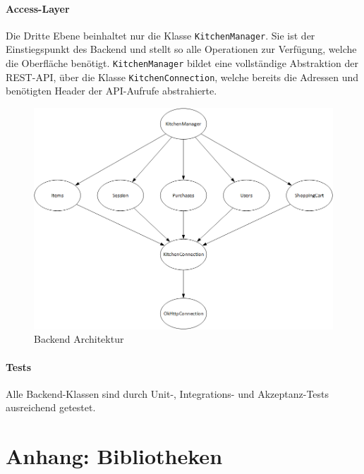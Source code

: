 \documentclass{scrartcl}
\begin{document}
	\paragraph*{Access-Layer}
	Die Dritte Ebene beinhaltet nur die Klasse \texttt{KitchenManager}. Sie ist der Einstiegspunkt des Backend und stellt so alle Operationen zur Verfügung, welche die Oberfläche benötigt. \texttt{KitchenManager} bildet eine vollständige Abstraktion der REST-API, über die Klasse \texttt{KitchenConnection}, welche bereits die Adressen und benötigten Header der API-Aufrufe abstrahierte.

	\begin{figure}[!h]
		\centering
		\includegraphics[scale=0.5]{./figures/classStructure.png}
		\caption{Backend Architektur}
		\label{backendArchitecture}
	\end{figure}

	\paragraph*{Tests}
	Alle Backend-Klassen sind durch Unit-, Integrations- und Akzeptanz-Tests ausreichend getestet.

	\section{Anhang: Bibliotheken} \label{bib}
\end{document}
